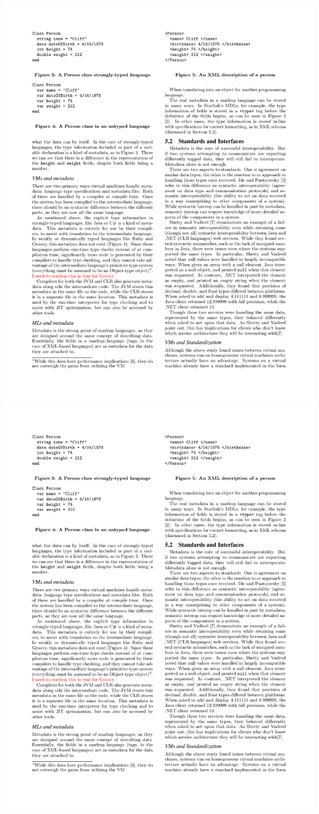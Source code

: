 \documentclass{beamer}
\newcommand{\linespace}{\vskip 0.25cm}
\begin{document}
\begin{frame}
\begin{columns}
  \begin{column}{0.5\textwidth}
  \includegraphics[scale=1]{graphics/StrongTypeCliff.pdf}
  \linespace
  \linespace
  \includegraphics[scale=1]{graphics/UnTypeCliff.pdf}

\end{column}
\end{columns}
\end{frame}
\end{document}
